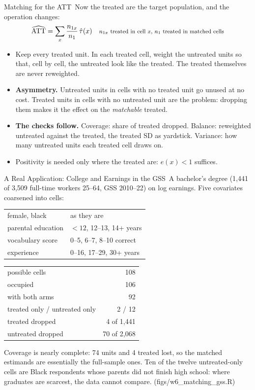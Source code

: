 \documentclass[aspectratio=169,11pt,xcolor=dvipsnames]{beamer}
\newcommand{\srcp}[1]{{\scriptsize\color{gray}(#1)}}
\newcommand{\core}{\,\raisebox{0.6pt}{\textcolor{corestar}{$\bigstar$}}}
\begin{document}
\begin{frame}{Matching for the ATT\core}
Now the treated are the target population, and the operation changes:
\begin{align*}
  \widehat{\text{ATT}} = \sum_x \frac{n_{1x}}{n_1}\,\hat\tau(x)
  && \text{\footnotesize $n_{1x}$ treated in cell $x$, $n_1$ treated in matched cells}
\end{align*}
\begin{itemize}\itemsep3pt
  \item Keep every treated unit. In each treated cell, weight the untreated
        units so that, cell by cell, the untreated look like the treated. The
        treated themselves are never reweighted.
  \item \textbf{Asymmetry.} Untreated units in cells with no treated unit go
        unused at no cost. Treated units in cells with no untreated unit are the
        problem: dropping them makes it the effect on the \emph{matchable} treated.
  \item \textbf{The checks follow.} Coverage: share of treated dropped. Balance:
        reweighted untreated against the treated, the treated SD as yardstick.
        Variance: how many untreated units each treated cell draws on.
  \item Positivity is needed only where the treated are: $e(x) < 1$ suffices.
\end{itemize}
\end{frame}

\begin{frame}{A Real Application: College and Earnings in the GSS\core}
A bachelor's degree (1,441 of 3,509 full-time workers 25--64, GSS 2010--22)
on log earnings. Five covariates coarsened into cells:
\begin{center}\footnotesize
\renewcommand{\arraystretch}{1.1}
\begin{tabular}{ll}
\toprule
female, black & as they are \\
parental education & ${<}12$, 12--13, 14+ years \\
vocabulary score & 0--5, 6--7, 8--10 correct \\
experience & 0--16, 17--29, 30+ years \\
\bottomrule
\end{tabular}
\qquad
\begin{tabular}{lr}
\toprule
possible cells & 108 \\
occupied & 106 \\
with both arms & 92 \\
treated only / untreated only & 2 / 12 \\
treated dropped & 4 of 1,441 \\
untreated dropped & 70 of 2,068 \\
\bottomrule
\end{tabular}
\end{center}
Coverage is nearly complete: 74 units and 4 treated lost, so the matched
estimands are essentially the full-sample ones. Ten of the twelve
untreated-only cells are Black respondents whose parents did not finish high
school: where graduates are scarcest, the data cannot compare.
\srcp{figs/w6\_matching\_gss.R}
\end{frame}
\end{document}
